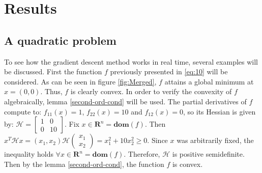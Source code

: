 \section{Results}
\subsection{A quadratic problem}
To see how the gradient descent method works in real time, several examples will be discussed. First the function $f$ previously presented in \ref{eq:10} will be considered. As can be seen in figure \ref{fig:Merged}, $f$ attains a global minimum at $x = (0,0).$ Thus, $f$ is clearly convex. In order to verify the convexity of $f$ algebraically, lemma \ref{second-ord-cond} will be used. The partial derivatives of $f$ compute to: $f_{11}(x) = 1$, $f_{22}(x) = 10$ and $f_{12}(x) = 0$, so its Hessian is given by: $
\mathcal{H} = 
\begin{bmatrix}
1 & 0 \\
0 & 10 
\end{bmatrix}
$.
Fix $x \in \mathbf{R}^{n} = \textbf{dom} (f).$ Then $x^{T} \mathcal{H} x = (x_{1}, x_{2}) \mathcal{H}  
\begin{pmatrix}
    x_{1} \\
    x_{2} 
\end{pmatrix}
= x_{1}^{2} + 10x_{2}^{2} \geq 0.
$
Since $x$ was arbitrarily fixed, the inequality holds $\forall x \in \mathbf{R}^{n} = \textbf{dom} (f).$ Therefore, $\mathcal{H}$ is positive semidefinite. Then by the lemma \ref{second-ord-cond}, the function $f$ is convex.
